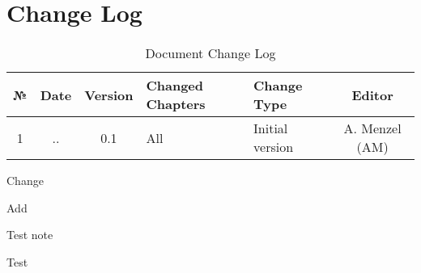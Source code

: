 %
%

\clearpage
\section*{Change Log}

\begin{table}[H]
	\centering
	\begin{tabularx}{\textwidth}{|c|c|c|X|X|c|}
		\hline
		\textbf{№} & \textbf{Date} & \textbf{Version} & \textbf{Changed Chapters} & \textbf{Change Type} & \textbf{Editor}\\
		\hline\hline
		1 & \the\day.\the\month.\the\year & 0.1 & All & Initial version & A. Menzel (AM) \\
		\hline
	\end{tabularx}
	\caption{Document Change Log}
	\label{tab:changelog}
\end{table}


Change 

Add 

Test note

Test 